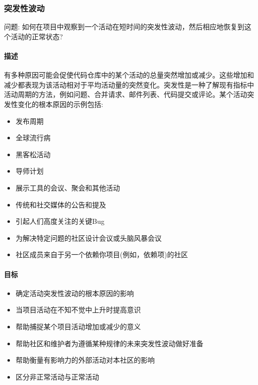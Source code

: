 \hypertarget{ux7a81ux53d1ux6027ux6ce2ux52a8}{%
\subsubsection{突发性波动}\label{ux7a81ux53d1ux6027ux6ce2ux52a8}}

问题:
如何在项目中观察到一个活动在短时间的突发性波动，然后相应地恢复到这个活动的正常状态?

\hypertarget{ux63cfux8ff0}{%
\paragraph{描述}\label{ux63cfux8ff0}}

有多种原因可能会促使代码仓库中的某个活动的总量突然增加或减少。这些增加和减少都表现为该活动相对于平均活动量的突然变化。突发性是一种了解现有指标中活动周期的方法，例如问题、合并请求、邮件列表、代码提交或评论。某个活动突发性变化的根本原因的示例包括:

\begin{itemize}
\tightlist
\item
  发布周期
\item
  全球流行病
\item
  黑客松活动
\item
  导师计划
\item
  展示工具的会议、聚会和其他活动
\item
  传统和社交媒体的公告和提及
\item
  引起人们高度关注的关键Bug
\item
  为解决特定问题的社区设计会议或头脑风暴会议
\item
  社区成员来自于另一个依赖你项目(例如，依赖项)的社区
\end{itemize}

\hypertarget{ux76eeux6807}{%
\paragraph{目标}\label{ux76eeux6807}}

\begin{itemize}
\tightlist
\item
  确定活动突发性波动的根本原因的影响
\item
  当项目活动在不知不觉中上升时提高意识
\item
  帮助捕捉某个项目活动增加或减少的意义
\item
  帮助社区和维护者为遵循某种规律的未来突发性波动做好准备
\item
  帮助衡量有影响力的外部活动对本社区的影响
\item
  区分非正常活动与正常活动
\end{itemize}


